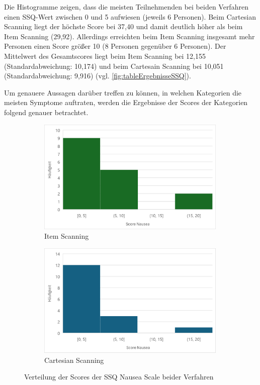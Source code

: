 Die Histogramme zeigen, dass die meisten Teilnehmenden bei beiden Verfahren einen SSQ-Wert zwischen 0 und 5 aufwiesen (jeweils 6 Personen). Beim Cartesian Scanning liegt der höchste Score bei 37,40 und damit deutlich höher als beim Item Scanning (29,92). Allerdings erreichten beim Item Scanning insgesamt mehr Personen einen Score größer 10 (8 Personen gegenüber 6 Personen). Der Mittelwert des Gesamtscores liegt beim Item Scanning bei 12,155 (Standardabweichung: 10,174) und beim Cartesain Scanning bei 10,051 (Standardabweichung: 9,916) (vgl. \autoref{fig:tableErgebnisseSSQ}).

Um genauere Aussagen darüber treffen zu können, in welchen Kategorien die meisten Symptome auftraten, werden die Ergebnisse der Scores der Kategorien folgend genauer betrachtet.

\begin{figure}
    \centering
    \begin{subfigure}{.5\textwidth}
        \centering
        \includegraphics[width=0.99\textwidth]{images/Results/Histogramm-Nausea-Scale-Item.png}
        \caption{Item Scanning}
        \label{fig:histoNauseaItem}   
    \end{subfigure}%
    \begin{subfigure}{.5\textwidth}
        \centering
        \includegraphics[width=0.99\textwidth]{images/Results/Histogramm-Nausea-Scale-Cartesian.png}
         \caption{Cartesian Scanning}
         \label{fig:histoNauseaCartesian}
    \end{subfigure}
    \caption{Verteilung der Scores der SSQ Nausea Scale beider Verfahren}
    \label{fig:histoNausea}
\end{figure}

